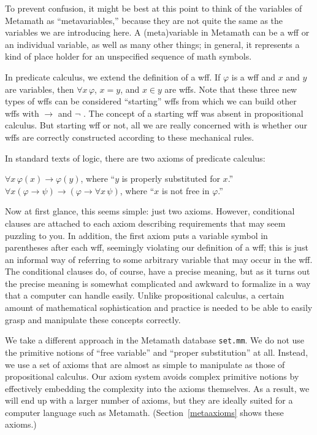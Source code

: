 To prevent confusion, it might be best at this point to think of the variables
of Metamath as ``metavariables,'' because
they are not quite the same as the variables we are introducing here.  A
(meta)variable in Metamath can be a wff or an individual variable, as well
as many other things; in general, it represents a kind of place holder for an
unspecified sequence of math symbols.

In predicate calculus, we extend the definition of a wff.  If $\varphi$ is a wff and $x$ and $y$ are variables, then
$\forall x \, \varphi$, $x=y$, and $x\in y$ are wffs. Note that these three new
types of wffs can be considered ``starting'' wffs from which we can build
other wffs with $\rightarrow$ and $\neg$ .  The concept of a starting wff was
absent in propositional calculus.  But starting wff or not, all we are really
concerned with is whether our wffs are correctly constructed according to
these mechanical rules.

In standard texts of logic, there are two axioms of predicate
calculus:
\begin{center}
  $\forall x \,\varphi ( x ) \rightarrow \varphi ( y )$,
      where ``$y$ is properly substituted for $x$.''\\
  $\forall x ( \varphi \rightarrow \psi )\rightarrow ( \varphi \rightarrow
    \forall x\, \psi )$,
    where ``$x$ is not free in $\varphi$.''
\end{center}

Now at first glance, this seems simple:  just two axioms.  However,
conditional clauses are attached to each axiom describing requirements that
may seem puzzling to you.  In addition, the first axiom puts a variable symbol
in parentheses after each wff, seemingly violating our definition of a
wff; this is just an informal way of
referring to some arbitrary variable that may occur in the wff.  The
conditional clauses do, of course, have a precise meaning, but as it turns out
the precise meaning is somewhat complicated and awkward to formalize in a
way that a computer can handle easily.  Unlike propositional calculus, a
certain amount of mathematical sophistication and practice is needed to be
able to easily grasp and manipulate these concepts correctly.

We take a different approach in the Metamath database
\texttt{set.mm}.  We do not
use the primitive notions of ``free variable'' and
``proper substitution'' at all.  Instead, we use a set
of axioms that are almost as simple to manipulate as those of
propositional calculus.  Our axiom system avoids complex primitive
notions by effectively embedding the complexity into the axioms
themselves.  As a result, we will end up with a larger number of axioms,
but they are ideally suited for a computer language such as Metamath.
(Section~\ref{metaaxioms} shows these axioms.)

